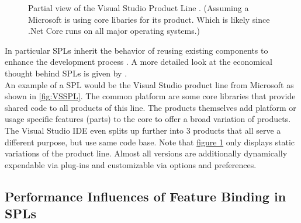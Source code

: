 \begin{figure}
	\centering
	\setlength\belowcaptionskip{-\baselineskip}
	\captionsetup{width=0.95\linewidth}
	
	\caption{Partial view of the Visual Studio Product Line \cite{VisualStudioSPL}. (Assuming a Microsoft is using core libaries for its product. Which is likely since .Net Core runs on all major operating systems.) }
	\label{fig:VSSPL}
\end{figure}\noindent
In particular SPLs inherit the behavior of reusing existing components to enhance the development process \cite{IssuesAndModelsInSPL}. A more detailed look at the economical thought behind SPLs is given by \citet{IssuesAndModelsInSPL}.\\
An example of a SPL would be the Visual Studio product line from Microsoft as shown in \autoref{fig:VSSPL}. The common platform are some core libraries that provide shared code to all products of this line. The products themselves add platform or usage specific features (parts) to the core to offer a broad variation of products. The Visual Studio IDE even splits up further into 3 products that all serve a different purpose, but use same code base. Note that \hyperref[fig:VSSPL]{figure 1} only displays static variations of the product line. Almost all versions are additionally dynamically expendable via plug-ins and customizable via options and preferences.

\subsection{Performance Influences of Feature Binding in SPLs}\label{sec:SPLPerformanceInfluence}

